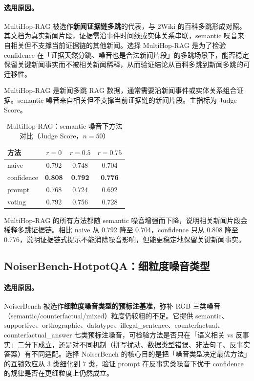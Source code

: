 \documentclass[UTF8,zihao=-4]{ctexart}
\begin{document}
\paragraph{选用原因。} MultiHop-RAG 被选作\textbf{新闻证据链多跳}的代表，与 2Wiki 的百科多跳形成对照。其文档为真实新闻片段，证据需沿事件时间线或实体关系串联，semantic 噪音来自相关但不支撑当前证据链的其他新闻。选择 MultiHop-RAG 是为了检验 confidence 在「证据天然分跳、噪音也是合法新闻片段」的多跳场景下，能否稳定保留关键新闻事实而不被相关新闻稀释，从而验证结论从百科多跳到新闻多跳的可迁移性。

MultiHop-RAG 是新闻多跳 RAG 数据，通常需要沿新闻事件或实体关系组合证据。semantic 噪音来自相关但不支撑当前证据链的新闻片段。主指标为 Judge Score。

\begin{table}[H]
  \centering
  \caption{MultiHop-RAG：semantic 噪音下方法对比（Judge Score，$n=50$）}
  \begin{tabular}{lccc}
    \toprule
    方法 & $r=0$ & $r=0.5$ & $r=0.75$ \\
    \midrule
    naive & 0.792 & 0.748 & 0.704 \\
    confidence & \textbf{0.808} & \textbf{0.792} & \textbf{0.776} \\
    prompt & 0.768 & 0.724 & 0.692 \\
    voting & 0.792 & 0.756 & 0.728 \\
    \bottomrule
  \end{tabular}
\end{table}

MultiHop-RAG 的所有方法都随 semantic 噪音增强而下降，说明相关新闻片段会稀释多跳证据链。相比 naive 从 0.792 降至 0.704，confidence 只从 0.808 降至 0.776，说明证据链式提示不能消除噪音影响，但能更稳定地保留关键新闻事实。

\subsection{NoiserBench-HotpotQA：细粒度噪音类型}

\paragraph{选用原因。} NoiserBench 被选作\textbf{细粒度噪音类型的预标注基准}，弥补 RGB 三类噪音（semantic/counterfactual/mixed）粒度仍较粗的不足。它提供 semantic、supportive、orthographic、datatype、illegal\_sentence、counterfactual、counterfactual\_answer 七类预标注噪音，可检验方法是否只在「语义相关 vs 反事实」二分下成立，还是对不同机制（拼写扰动、数据类型错误、非法句子、反事实答案）有不同适配。选择 NoiserBench 的核心目的是把「噪音类型决定最优方法」的互锁效应从 3 类细化到 7 类，验证 prompt 在反事实类噪音下优于 confidence 的规律是否在更细粒度上仍然成立。
\end{document}
